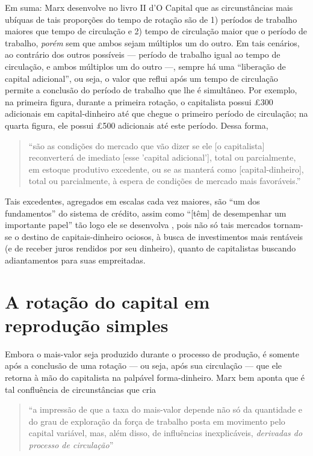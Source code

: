 \documentclass[12pt]{article}
\numberwithin{equation}{section}
\theoremstyle{plain}
\theoremstyle{definition}
\theoremstyle{remark}
\begin{document}
Em suma: Marx desenvolve no livro II d'O Capital que as circunstâncias mais ubíquas de tais proporções do tempo de rotação são de 1) períodos de trabalho maiores que tempo de circulação e 2) tempo de circulação maior que o período de trabalho, \textit{porém} sem que ambos sejam múltiplos um do outro. Em tais cenários, ao contrário dos outros possíveis — período de trabalho igual ao tempo de circulação, e ambos múltiplos um do outro —, sempre há uma ``liberação de capital adicional'', ou seja, o valor que reflui após um tempo de circulação permite a conclusão do período de trabalho que lhe é simultâneo. Por exemplo, na primeira figura, durante a primeira rotação, o capitalista possui £300 adicionais em capital-dinheiro até que chegue o primeiro período de circulação; na quarta figura, ele possui £500 adicionais até este período. Dessa forma, 
\begin{quote}
``são as condições do mercado que vão dizer se ele [o capitalista] reconverterá de imediato [esse 'capital adicional'], total ou parcialmente, em estoque produtivo excedente, ou se as manterá como [capital-dinheiro], total ou parcialmente, à espera de condições de mercado mais favoráveis.'' \parencite[p. 378-9]{Marx2014}
\end{quote}

Tais excedentes, agregados em escalas cada vez maiores, são ``um dos fundamentos'' do sistema de crédito, assim como ``[têm] de desempenhar um importante papel'' tão logo ele se desenvolva \parencite[p. 379]{Marx2014}, pois não só tais mercados tornam-se o destino de capitais-dinheiro ociosos, à busca de investimentos mais rentáveis (e de receber juros rendidos por seu dinheiro), quanto de capitalistas buscando adiantamentos para suas empreitadas.

\section{A rotação do capital em reprodução simples}
Embora o mais-valor seja produzido durante o processo de produção, é somente após a conclusão de uma rotação — ou seja, após sua circulação — que ele retorna à mão do capitalista na palpável forma-dinheiro. Marx bem aponta que é tal confluência de circunstâncias que cria
\begin{quote}
``a impressão de que a taxa do mais-valor depende não só da quantidade e do grau de exploração da força de trabalho posta em movimento pelo capital variável, mas, além disso, de influências inexplicáveis, \textit{derivadas do processo de circulação}'' \parencite[p. 394, grifo meu]{Marx2014}
\end{quote}
\end{document}
